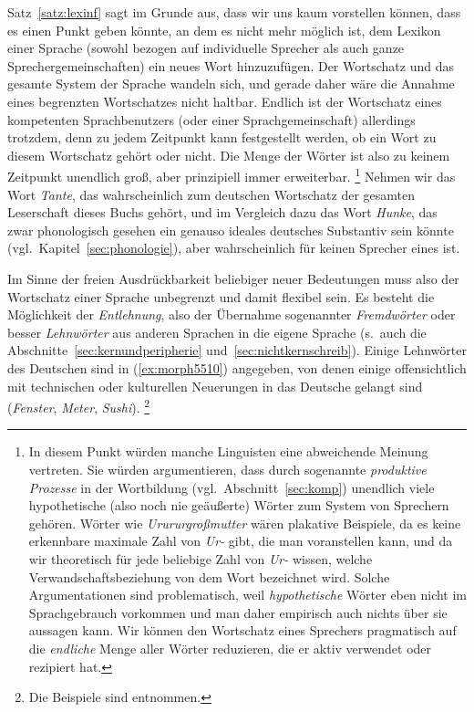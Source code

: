 Satz~\ref{satz:lexinf} sagt im Grunde aus, dass wir uns kaum vorstellen können, dass es einen Punkt geben könnte, an dem es nicht mehr möglich ist, dem Lexikon einer Sprache (sowohl bezogen auf individuelle Sprecher als auch ganze Sprechergemeinschaften) ein neues Wort hinzuzufügen.
Der Wortschatz und das gesamte System der Sprache wandeln sich, und gerade daher wäre die Annahme eines begrenzten Wortschatzes nicht haltbar.
Endlich ist der Wortschatz eines kompetenten Sprachbenutzers (oder einer Sprachgemeinschaft) allerdings trotzdem, denn zu jedem Zeitpunkt kann festgestellt werden, ob ein Wort zu diesem Wortschatz gehört oder nicht.
Die Menge der Wörter ist also zu keinem Zeitpunkt unendlich groß, aber prinzipiell immer erweiterbar.%
\footnote{In diesem Punkt würden manche Linguisten eine abweichende Meinung vertreten.
Sie würden argumentieren, dass durch sogenannte \textit{produktive Prozesse} in der Wortbildung (vgl.\ Abschnitt~\ref{sec:komp}) unendlich viele hypothetische (also noch nie geäußerte) Wörter zum System von Sprechern gehören.
Wörter wie \textit{Urururgroßmutter} wären plakative Beispiele, da es keine erkennbare maximale Zahl von \textit{Ur-} gibt, die man voranstellen kann, und da wir theoretisch für jede beliebige Zahl von \textit{Ur-} wissen, welche Verwandschaftsbeziehung von dem Wort bezeichnet wird.
Solche Argumentationen sind problematisch, weil \textit{hypothetische} Wörter eben nicht im Sprachgebrauch vorkommen und man daher empirisch auch nichts über sie aussagen kann.
Wir können den Wortschatz eines Sprechers pragmatisch auf die \textit{endliche} Menge aller Wörter reduzieren, die er aktiv verwendet oder rezipiert hat.}
Nehmen wir das Wort \textit{Tante}, das wahrscheinlich zum deutschen Wortschatz der gesamten Leserschaft dieses Buchs gehört, und im Vergleich dazu das Wort \textit{Hunke}, das zwar phonologisch gesehen ein genauso ideales deutsches Substantiv sein könnte (vgl.\ Kapitel~\ref{sec:phonologie}), aber wahrscheinlich für keinen Sprecher eines ist.

Im Sinne der freien Ausdrückbarkeit beliebiger neuer Bedeutungen muss also der Wortschatz einer Sprache unbegrenzt und damit flexibel sein.
Es besteht die Möglichkeit der \textit{Entlehnung}, also der Übernahme sogenannter \textit{Fremdwörter} oder besser \textit{Lehnwörter} aus anderen Sprachen in die eigene Sprache (s.\ auch die Abschnitte~\ref{sec:kernundperipherie} und~\ref{sec:nichtkernschreib}).
Einige Lehnwörter des Deutschen sind in (\ref{ex:morph5510}) angegeben, von denen einige offensichtlich mit technischen oder kulturellen Neuerungen in das Deutsche gelangt sind (\textit{Fenster}, \textit{Meter}, \textit{Sushi}).%
\footnote{Die Beispiele sind \citet{Kluge2002} entnommen.}

